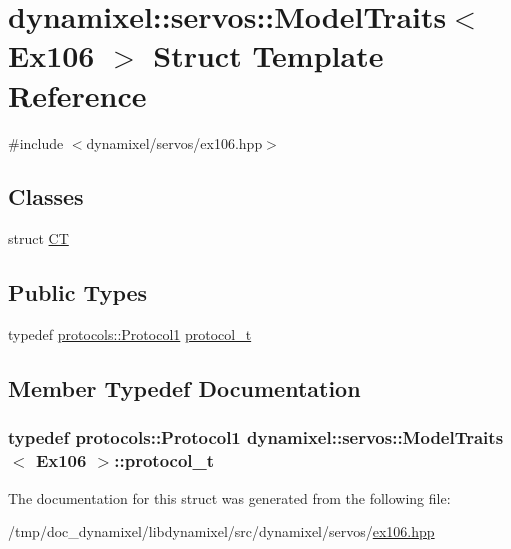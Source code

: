 \hypertarget{structdynamixel_1_1servos_1_1_model_traits_3_01_ex106_01_4}{}\section{dynamixel\+:\+:servos\+:\+:Model\+Traits$<$ Ex106 $>$ Struct Template Reference}
\label{structdynamixel_1_1servos_1_1_model_traits_3_01_ex106_01_4}


{\ttfamily \#include $<$dynamixel/servos/ex106.\+hpp$>$}

\subsection*{Classes}
\begin{DoxyCompactItemize}
\item 
struct \hyperlink{structdynamixel_1_1servos_1_1_model_traits_3_01_ex106_01_4_1_1_c_t}{CT}
\end{DoxyCompactItemize}
\subsection*{Public Types}
\begin{DoxyCompactItemize}
\item 
typedef \hyperlink{classdynamixel_1_1protocols_1_1_protocol1}{protocols\+::\+Protocol1} \hyperlink{structdynamixel_1_1servos_1_1_model_traits_3_01_ex106_01_4_a86132ee755c36e43ee810156e8a5cba1}{protocol\+\_\+t}
\end{DoxyCompactItemize}


\subsection{Member Typedef Documentation}
\subsubsection[{\texorpdfstring{protocol\+\_\+t}{protocol_t}}]{\setlength{\rightskip}{0pt plus 5cm}typedef {\bf protocols\+::\+Protocol1} {\bf dynamixel\+::servos\+::\+Model\+Traits}$<$ {\bf Ex106} $>$\+::{\bf protocol\+\_\+t}}\hypertarget{structdynamixel_1_1servos_1_1_model_traits_3_01_ex106_01_4_a86132ee755c36e43ee810156e8a5cba1}{}\label{structdynamixel_1_1servos_1_1_model_traits_3_01_ex106_01_4_a86132ee755c36e43ee810156e8a5cba1}


The documentation for this struct was generated from the following file\+:\begin{DoxyCompactItemize}
\item 
/tmp/doc\+\_\+dynamixel/libdynamixel/src/dynamixel/servos/\hyperlink{ex106_8hpp}{ex106.\+hpp}\end{DoxyCompactItemize}
